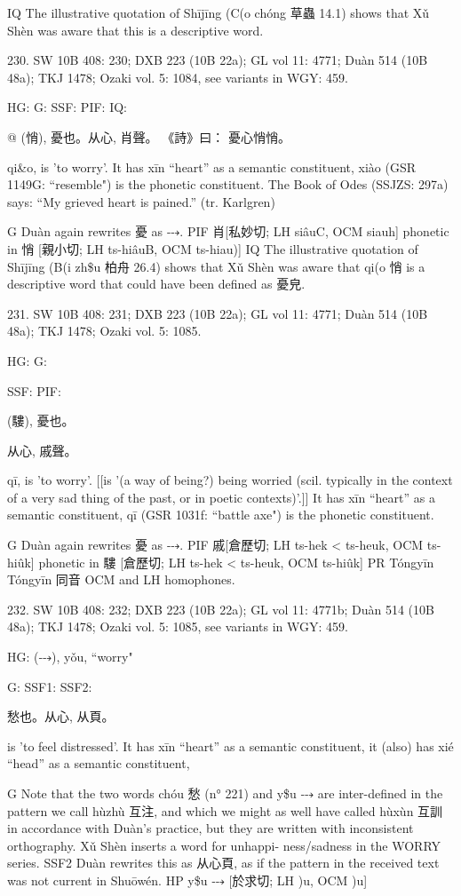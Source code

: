 IQ	The illustrative quotation of Shījīng (C(o chóng 草蟲 14.1) shows that Xǔ Shèn was aware that this is a descriptive word.


230. SW 10B 408: 230; DXB 223 (10B 22a); GL vol 11: 4771; Duàn 514 (10B 48a); TKJ 1478; Ozaki vol. 5: 1084, see
variants in WGY: 459.


HG:
G: SSF: PIF: IQ:

@ (悄), 憂也。从心,
肖聲。
《詩》曰： 憂心悄悄。


qi&o,
is 'to worry'.
It has xīn ``heart'' as a semantic constituent,
xiào (GSR 1149G: ``resemble") is the phonetic constituent.
The Book of Odes (SSJZS: 297a) says: ``My grieved heart is pained.'' (tr. Karlgren)

G	Duàn again rewrites 憂 as ⤏.
PIF     肖[私妙切; LH siâuC, OCM siauh] phonetic in 悄 [親小切; LH ts-hiâuB, OCM ts-hiau)]
IQ	The illustrative quotation of Shījīng (B(i zh\$u 柏舟 26.4) shows that Xǔ Shèn was aware that
qi(o 悄 is a descriptive word that could have been defined as 憂皃.

231. SW 10B 408: 231; DXB 223 (10B 22a); GL vol 11: 4771; Duàn 514 (10B 48a); TKJ 1478; Ozaki vol. 5: 1085.



HG:
G:


SSF: PIF:

(䮫),
憂也。

从心, 戚聲。

qī,
is 'to worry'. [[is '(a way of being?) being worried (scil. typically in the context of a very sad thing of the past, or in poetic contexts)'.]]
It has xīn ``heart'' as a semantic constituent,
qī (GSR 1031f: ``battle axe") is the phonetic constituent.

G	Duàn again rewrites 憂 as ⤏.
PIF     戚[倉歷切; LH ts-hek < ts-heuk, OCM ts-hiûk] phonetic in 䮫 [倉歷切; LH ts-hek < ts-heuk, OCM ts-hiûk]
PR	Tóngyīn Tóngyīn 同音 OCM and LH homophones.

232. SW 10B 408: 232; DXB 223 (10B 22a); GL vol 11: 4771b; Duàn 514 (10B 48a); TKJ 1478; Ozaki vol. 5: 1085, see
variants in WGY: 459.

HG:	(⤏),	yǒu, ``worry"




G: SSF1: SSF2:

愁也。从心, 从頁。

is 'to feel distressed'.
It has xīn ``heart'' as a semantic constituent,
it (also) has xié ``head'' as a semantic constituent,

G Note that the two words chóu 愁 (n° 221) and y\$u ⤏ are inter-defined in the pattern we call hùzhù 互注, and which we might as well have called hùxùn 互訓 in accordance with Duàn's practice, but they are written with inconsistent orthography. Xǔ Shèn inserts a word for unhappi- ness/sadness in the WORRY series.
SSF2 Duàn rewrites this as 从心頁, as if the pattern in the received text was not current in
Shuōwén.
HP      y\$u ⤏ [於求切; LH )u, OCM )u]

